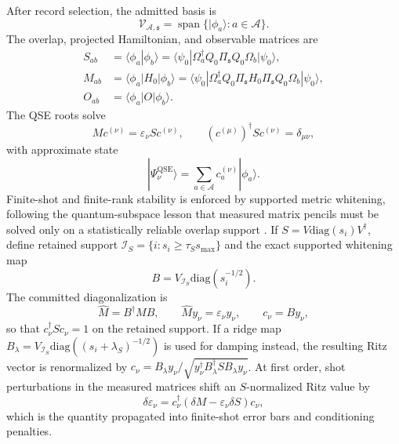 \documentclass[
  reprint,
  amsmath,
  amssymb,
  aps,
  pra,
  nofootinbib,
  superscriptaddress,
  floatfix
]{revtex4-2}
\newcommand{\Acal}{\mathcal{A}}
\newcommand{\Vcal}{\mathcal{V}}
\newcommand{\qse}{\mathrm{QSE}}
\newcommand{\diag}{\mathrm{diag}}
\newcommand{\spanop}{\operatorname{span}}
\newcommand{\ket}[1]{|#1\rangle}
\newcommand{\bra}[1]{\langle #1|}
\newcommand{\braket}[2]{\langle #1|#2\rangle}
\begin{document}
After record selection, the admitted basis is
\begin{equation}
\Vcal_{\Acal,\mathfrak s}
=
\spanop\{\ket{\phi_a}:a\in\Acal\}.
\label{eq:qse_subspace}
\end{equation}
The overlap, projected Hamiltonian, and observable matrices are
\begin{align}
S_{ab}
&=
\braket{\phi_a}{\phi_b}
=
\bra{\psi_0}\Omega_a^\dagger Q_0\Pi_{\mathfrak s}Q_0\Omega_b\ket{\psi_0},
\nonumber\\
M_{ab}
&=
\bra{\phi_a}H_0\ket{\phi_b}
=
\bra{\psi_0}\Omega_a^\dagger Q_0\Pi_{\mathfrak s}H_0\Pi_{\mathfrak s}Q_0\Omega_b\ket{\psi_0},
\nonumber\\
O_{ab}
&=
\bra{\phi_a}O\ket{\phi_b}.
\label{eq:qse_matrices}
\end{align}
The QSE roots solve
\begin{equation}
M c^{(\nu)}=\varepsilon_\nu S c^{(\nu)},
\qquad
(c^{(\mu)})^\dagger S c^{(\nu)}=\delta_{\mu\nu},
\label{eq:qse_gep}
\end{equation}
with approximate state
\begin{equation}
\ket{\Psi_\nu^{\qse}}
=
\sum_{a\in\Acal}c_a^{(\nu)}\ket{\phi_a}.
\label{eq:qse_state}
\end{equation}
Finite-shot and finite-rank stability is enforced by supported metric whitening, following the quantum-subspace lesson that measured matrix pencils must be solved only on a statistically reliable overlap support \cite{Epperly2022QSD,Lee2024SamplingQKSD,Kwao2026GEPQSE}.  If
$S=V\diag(s_i)V^\dagger$, define retained support
$\mathcal I_S=\{i:s_i\ge\tau_Ss_{\max}\}$ and the exact supported whitening map
\begin{equation}
B
=
V_{\mathcal I_S}
\diag(s_i^{-1/2}) .
\label{eq:qse_metric_whitening}
\end{equation}
The committed diagonalization is
\begin{equation}
\widehat M
=
B^\dagger MB,
\qquad
\widehat M y_\nu=\varepsilon_\nu y_\nu,
\qquad
c_\nu=By_\nu ,
\label{eq:qse_whitened_gep}
\end{equation}
so that $c_\nu^\dagger S c_\nu=1$ on the retained support.  If a ridge map
$B_\lambda=V_{\mathcal I_S}\diag((s_i+\lambda_S)^{-1/2})$ is used for damping instead, the resulting Ritz vector is renormalized by
$c_\nu=B_\lambda y_\nu/\sqrt{y_\nu^\dagger B_\lambda^\dagger S B_\lambda y_\nu}$.
At first order, shot perturbations in the measured matrices shift an $S$-normalized Ritz value by
\begin{equation}
\delta\varepsilon_\nu
=
c_\nu^\dagger(\delta M-\varepsilon_\nu\delta S)c_\nu ,
\label{eq:qse_first_order_shot_shift}
\end{equation}
which is the quantity propagated into finite-shot error bars and conditioning penalties.
\end{document}
